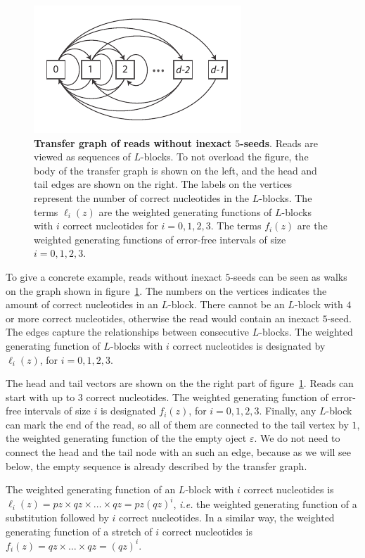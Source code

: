 \documentclass{article}
\begin{document}
\begin{figure}[h]
\centering
\includegraphics[scale=.79]{inexact_graph.pdf}
\caption{\textbf{Transfer graph of reads without inexact $5$-seeds}. Reads
are viewed as sequences of $L$-blocks. To not overload the figure, the
body of the transfer graph is shown on the left, and the head and tail
edges are shown on the right. The labels on the vertices represent the
number of correct nucleotides in the $L$-blocks. The terms $\ell_i(z)$ are
the weighted generating functions of $L$-blocks with $i$ correct
nucleotides for $i = 0,1,2,3$. The terms $f_i(z)$ are the weighted
generating functions of error-free intervals of size $i = 0,1,2,3$.}
\label{fig:inexact_graph}
\end{figure}

To give a concrete example, reads without inexact $5$-seeds can be seen as
walks on the graph shown in figure~\ref{fig:inexact_graph}. The numbers on
the vertices indicates the amount of correct nucleotides in an $L$-block.
There cannot be an $L$-block with $4$ or more correct nucleotides,
otherwise the read would contain an inexact $5$-seed. The edges capture
the relationships between consecutive $L$-blocks. The weighted generating
function of $L$-blocks with $i$ correct nucleotides is designated by
$\ell_i(z)$, for $i = 0, 1, 2, 3$.

The head and tail vectors are shown on the the right part of
figure~\ref{fig:inexact_graph}. Reads can start with up to $3$ correct
nucleotides. The weighted generating function of error-free intervals of
size $i$ is designated $f_i(z)$, for $i = 0, 1, 2, 3$. Finally, any
$L$-block can mark the end of the read, so all of them are connected to
the tail vertex by $1$, the weighted generating function of the the empty
oject $\varepsilon$. We do not need to connect the head and the tail node
with an such an edge, because as we will see below, the empty sequence is
already described by the transfer graph.

The weighted generating function of an $L$-block with $i$ correct
nucleotides is $\ell_i(z) = pz \times qz \times \ldots \times qz =
pz(qz)^i$, \textit{i.e.} the weighted generating function of a
substitution followed by $i$ correct nucleotides. In a similar way, the
weighted generating function of a stretch of $i$ correct nucleotides is
$f_i(z) = qz \times \ldots \times qz = (qz)^i$.
\end{document}
